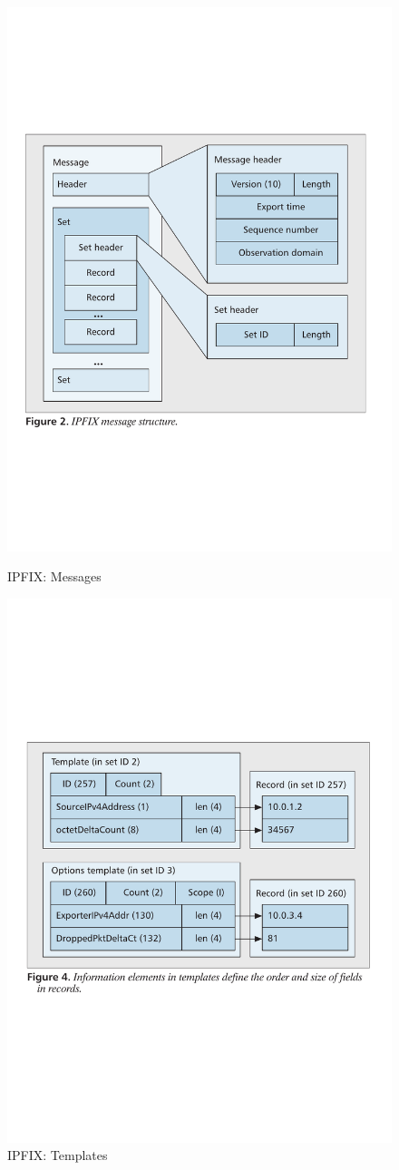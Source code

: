 \begin{figure}[ht]
	\begin{minipage}[b]{0.49\linewidth}
		\centering
		\includegraphics[width=0.7\linewidth]{figures/ipfix-message-structure}
		\caption{IPFIX: Messages \cite{btrammell:2011}}
		\label{fig:ipfix-message-structure}
	\end{minipage}	
	\begin{minipage}[b]{0.49\linewidth}
		\centering
		\includegraphics[width=0.7\linewidth]{figures/ipfix-information-element}
		\caption{IPFIX: Templates \cite{btrammell:2011}}
		\label{fig:ipfix-information-element}
	\end{minipage}	
\end{figure}
